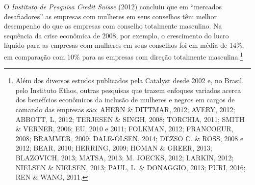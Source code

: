 O \emph{Instituto de Pesquisa Credit Suisse} (2012) concluiu que em
``mercados desafiadores'' as empresas com mulheres em seus conselhos têm
melhor desempenho do que as empresas com conselho totalmente masculino.
Na sequência da crise econômica de 2008, por exemplo, o crescimento do
lucro líquido para as empresas com mulheres em seus conselhos foi em
média de 14\%, em comparação com 10\% para as empresas com direção
totalmente masculina.\footnote{Além dos diversos estudos publicados pela
  Catalyst desde 2002 e, no Brasil, pelo Instituto Ethos, outras
  pesquisas que trazem enfoques variados acerca dos benefícios
  econômicos da inclusão de mulheres e negros em cargos de comando das
  empresas são: AHERN \& DITTMAR, 2012; AVERY, 2012; ABBOTT, L, 2012;
  TERJESEN \& SINGH, 2008; TORCHIA, 2011; SMITH \& VERNER, 2006; EU,
  2010 e 2011; FOLKMAN, 2012; FRANCOEUR, 2008; BRAMMER, 2009;
  DALE-OLSEN, 2014; DEZSO C. \& ROSS, 2008 e 2012; BEAR, 2010; HERRING,
  2009; HOMAN \& GREER, 2013; BLAZOVICH, 2013; MATSA, 2013; M. JOECKS,
  2012; LARKIN, 2012; NIELSEN \& NIELSEN, 2013; PAUL, L. \& DONAGGIO,
  2013; PURI, 2016; REN \& WANG, 2011.}

